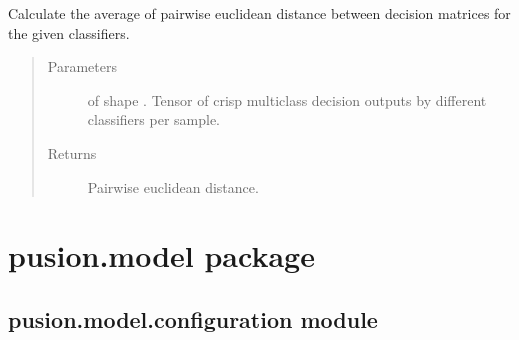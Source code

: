 \documentclass[letterpaper,10pt,english]{sphinxmanual}
\begin{document}
\begin{fulllineitems}
\label{\detokenize{pusion.evaluation.evaluation_metrics:pusion.evaluation.evaluation_metrics.pairwise_euclidean_distance}}
\sphinxAtStartPar
Calculate the average of pairwise euclidean distance between decision matrices for the given classifiers.
\begin{quote}\begin{description}
\item[{Parameters}] \leavevmode
\sphinxAtStartPar
{} \textendash{}  of shape .
Tensor of crisp multiclass decision outputs by different classifiers per sample.

\item[{Returns}] \leavevmode
\sphinxAtStartPar
Pairwise euclidean distance.

\end{description}\end{quote}

\end{fulllineitems}



\section{pusion.model package}
\label{\detokenize{pusion.model:pusion-model-package}}\label{\detokenize{pusion.model::doc}}

\subsection{pusion.model.configuration module}
\label{\detokenize{pusion.model.configuration:module-pusion.model.configuration}}\label{\detokenize{pusion.model.configuration:pusion-model-configuration-module}}\label{\detokenize{pusion.model.configuration::doc}}
\end{document}
